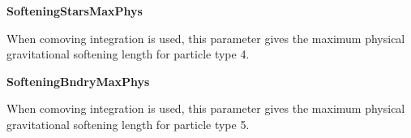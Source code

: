 \begin{DoxyItemize}
\item {\bfseries SofteningStarsMaxPhys} \par
 When comoving integration is used, this parameter gives the maximum physical gravitational softening length for particle type 4.
\end{DoxyItemize}


\begin{DoxyItemize}
\item {\bfseries SofteningBndryMaxPhys} \par
 When comoving integration is used, this parameter gives the maximum physical gravitational softening length for particle type 5. 
\end{DoxyItemize}